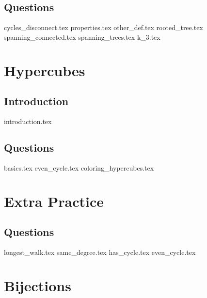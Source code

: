 \documentclass{exam}
\begin{document}
\subsection{Questions}
\begin{questions}
{cycles_disconnect.tex}
{properties.tex}
{other_def.tex}
{rooted_tree.tex}
{spanning_connected.tex}
{spanning_trees.tex}
{k_3.tex}
\end{questions}

\section{Hypercubes}
\subsection{Introduction}
{introduction.tex}
\subsection{Questions}
\begin{questions}
{basics.tex}
{even_cycle.tex}
{coloring_hypercubes.tex}
\end{questions}

\section{Extra Practice}
\subsection{Questions}
\begin{questions}
{longest_walk.tex}
{same_degree.tex}
{has_cycle.tex}
{even_cycle.tex}
\end{questions}

\section{Bijections}
\end{document}
